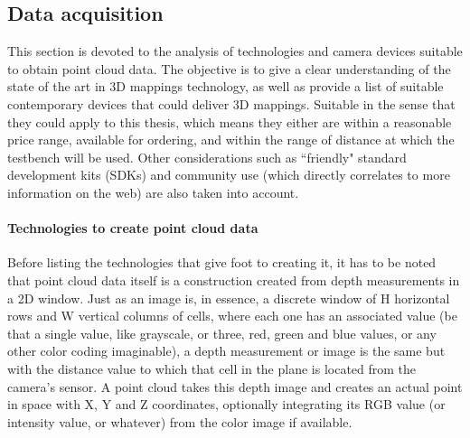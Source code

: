 \documentclass[../main.tex]{subfiles}
\begin{document}
\subsection{Data acquisition} \label{sec:data_acquisition}
This section is devoted to the analysis of technologies and camera devices suitable to obtain point cloud data. The objective is to give a clear understanding of the state of the art in 3D mappings technology, as well as provide a list of suitable contemporary devices that could deliver 3D mappings. Suitable in the sense that they could apply to this thesis, which means they either are within a reasonable price range, available for ordering, and within the range of distance at which the testbench will be used. Other considerations such as ``friendly" standard development kits (SDKs) and community use (which directly correlates to more information on the web) are also taken into account.

\paragraph{Technologies to create point cloud data}
Before listing the technologies that give foot to creating it, it has to be noted that point cloud data itself is a construction created from depth measurements in a 2D window. Just as an image is, in essence, a discrete window of H horizontal rows and W vertical columns of cells, where each one has an associated value (be that a single value, like grayscale, or three, red, green and blue values, or any other color coding imaginable), a depth measurement or image is the same but with the distance value to which that cell in the plane is located from the camera's sensor. A point cloud takes this depth image and creates an actual point in space with X, Y and Z coordinates, optionally integrating its RGB value (or intensity value, or whatever) from the color image if available.
\end{document}
